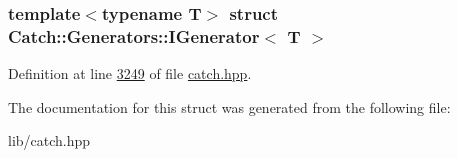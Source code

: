 \subsubsection*{template$<$typename T$>$\newline
struct Catch\+::\+Generators\+::\+I\+Generator$<$ T $>$}



Definition at line \mbox{\hyperlink{catch_8hpp_source_l03249}{3249}} of file \mbox{\hyperlink{catch_8hpp_source}{catch.\+hpp}}.



The documentation for this struct was generated from the following file\+:\begin{DoxyCompactItemize}
\item 
lib/catch.\+hpp\end{DoxyCompactItemize}
